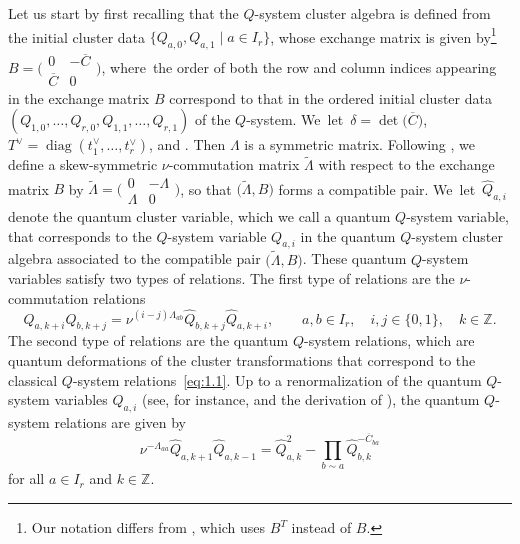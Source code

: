 \documentclass[10pt,a4paper]{amsart}
\numberwithin{equation}{section}
\DeclareMathOperator{\diag}{diag}
\begin{document}
Let us start by first recalling that the  $Q$-system cluster algebra is defined from the initial cluster data $\{Q_{a,0},Q_{a,1}\mid a\in I_r\}$, whose exchange matrix is given by\footnote{Our notation differs from \cite{Williams15}, which uses $B^T$ instead of $B$.}
$
B
=\big(\begin{smallmatrix}
0 & -\overline{C} \\
\overline{C} & 0
\end{smallmatrix}\big)$,
where~the order of both the row and column indices appearing in the exchange matrix $B$ correspond to that in the ordered initial cluster data $(Q_{1,0},\dots,Q_{r,0},Q_{1,1},\dots,Q_{r,1})$ of the  $Q$-system. We~let~${\delta=\det\bigl(\overline{C}\bigr)}$, $T^{\vee}=\diag(t_1^{\vee} ,\dots,t_r^{\vee})$, and . Then $\Lambda$ is a symmetric matrix. Following \cite[Definition 3.1]{BZ05}, we define a skew-symmetric $\nu$-commutation matrix $\tilde{\Lambda}$ with respect to the exchange matrix $B$ by
$
\tilde{\Lambda}=\big(
\begin{smallmatrix}
0 & -\Lambda \\
\Lambda & 0
\end{smallmatrix}\big)$,
so that $\bigl(\tilde{\Lambda},B\bigr)$ forms a compatible pair. We~let~$\widehat{Q}_{a,i}$ denote the quantum cluster variable, which we call a quantum $Q$-system variable, that corresponds to the $Q$-system variable $Q_{a,i}$ in the quantum  $Q$-system cluster algebra associated to the compatible pair $\bigl(\tilde{\Lambda},B\bigr)$. These quantum $Q$-system variables satisfy two types of relations. The first type of relations are the $\nu$-commutation relations
\begin{equation*}
\widehat{Q}_{a,k+i}\widehat{Q}_{b,k+j}=\nu^{(i-j)\Lambda_{ab}} \widehat{Q}_{b,k+j}\widehat{Q}_{a,k+i},\qquad a,b\in I_r,\quad i,j\in\{0,1\},\quad k\in\mathbb{Z}.
\end{equation*}
The second type of relations are the quantum  $Q$-system relations, which are quantum deformations of the cluster transformations that correspond to the classical  $Q$-system relations~\eqref{eq:1.1}. Up to a renormalization of the quantum $Q$-system variables $\widehat{Q}_{a,i}$ (see, for instance, \cite[Lemma~4.4]{DFK21} and the derivation of \cite[equation~(3.20)]{Lin21}), the quantum  $Q$-system relations are given by
\begin{equation}\label{eq:4.4}
\nu^{-\Lambda_{aa}}\widehat{Q}_{a,k+1}\widehat{Q}_{a,k-1}= \widehat{Q}_{a,k}^2-\prod_{b\sim a}\widehat{Q}_{b,k}^{-\overline{C}_{ba}}
\end{equation}
for all $a\in I_r$ and $k\in\mathbb{Z}$.
\end{document}
